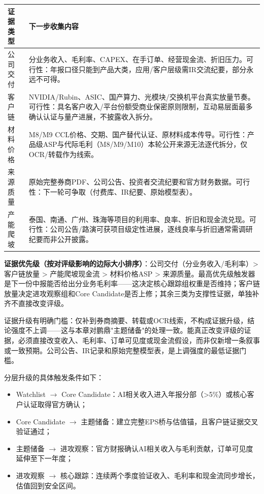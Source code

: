 \begin{dashboardbox}[提升置信度前需要补充的证据]
\small
\begin{tabularx}{\textwidth}{L{3.2cm}X}
\toprule
\textbf{证据类型} & \textbf{下一步收集内容} \\
\midrule
公司交付 & 分业务收入、毛利率、CAPEX、在手订单、经营现金流、折旧压力。可行性：年报口径只能到产品大类，应用/客户层级需IR交流纪要，部分永远不可得。 \\
客户链 & NVIDIA/Rubin、ASIC、国产算力、光模块/交换机平台真实放量节奏。可行性：具名客户收入/平台份额受商业保密原则限制，互动易层面最多确认认证与量产进展，不披露收入拆分。 \\
材料价格 & M8/M9 CCL价格、交期、国产替代认证、原材料成本传导。可行性：产品级ASP与代际毛利（M8/M9/M10）本轮公开来源无法逐代拆分，仅OCR/转载作为线索。 \\
来源质量 & 原始完整券商PDF、公司公告、投资者交流纪要和官方财务数据。可行性：下一轮可争取（付费库、IR纪要、原始模型表）。 \\
产能爬坡 & 泰国、南通、广州、珠海等项目的利用率、良率、折旧和现金流兑现。可行性：公司公告/路演可获项目级定性进展，逐线良率与折旧通常需调研纪要而非公开披露。 \\
\bottomrule
\end{tabularx}
\end{dashboardbox}

\textbf{证据优先级（按对评级影响的边际大小排序）}：公司交付（分业务收入/毛利率）> 客户链放量 > 产能爬坡现金流 > 材料价格ASP > 来源质量。最高优先级触发器是下一份中报能否给出分业务毛利率——这决定核心跟踪组权重是否维持；客户链放量决定进攻观察组和Core Candidate是否上修；其余三类为支撑性证据，单独补齐不直接改变评级。

证据升级有明确门槛：仅补到券商摘要、转载或OCR线索，不构成证据升级，结论强度不上调——这与本章对鹏鼎"主题储备"的处理一致。能真正改变评级的证据，必须直接改变收入、毛利率、订单可见度或现金流假设，而非仅新增一条叙事或一致预期。公司公告、IR记录和原始完整模型表，是上调强度的最低证据门槛。

分层升级的具体触发条件如下：
\begin{itemize}
\item Watchlist $\rightarrow$ Core Candidate：AI相关收入进入年报分部（>5\%）或核心客户认证取得官方确认；
\item Core Candidate $\rightarrow$ 主题储备：建立完整EPS桥与估值锚，且客户链证据交叉验证通过；
\item 主题储备 $\rightarrow$ 进攻观察：官方财报确认AI相关收入与毛利贡献，订单可见度延伸至下一年度；
\item 进攻观察 $\rightarrow$ 核心跟踪：连续两个季度验证收入、毛利率和现金流同步增长，估值回到安全区间。
\end{itemize}
